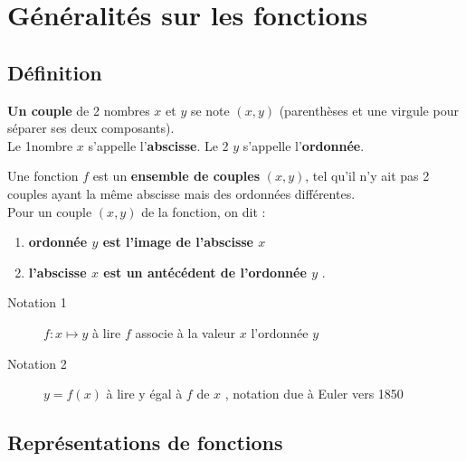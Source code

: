 \documentclass[main.tex]{subfiles}
\begin{document}
 
\cleardoublepage 
{}  
\pagestyle{scrheadings} %
\onehalfspacing 
\setcounter{chapter}{6}
\chapter{Généralités sur les fonctions}



\section{Définition}
\textbf{Un couple}  de 2 nombres $x$ et $y$ se note $(x,y)$ (parenthèses et une virgule pour séparer ses deux composants). \\
Le 1\ier nombre $x$ s'appelle l'\textbf{abscisse}. Le 2 $y$ s'appelle l'\textbf{ordonnée}.  
\begin{definition} 
	Une fonction $f$ est un \textbf{ensemble de couples} $(x,y)$, tel qu'il n'y ait pas 2 couples  ayant la même abscisse mais des ordonnées différentes.  \\
	Pour un couple $(x,y)$ de la fonction, on dit :
	\begin{enumerate}[label=\textbullet,leftmargin=*]
		\item \og \textbf{ordonnée $y$ est l'image de l'abscisse $x$} \fg{}  
		\item \og \textbf{l'abscisse $x$ est un antécédent de l'ordonnée $y$} \fg{}.  
	\end{enumerate} 
\end{definition} 

\begin{description}
	\item[Notation 1] \og $f\colon x\mapsto y$ \fg \quad à lire \og	$f$ associe à la valeur $x$ l'ordonnée $y$ \fg{}
	\item[Notation 2] \og $y = f(x)$ \fg \quad  à lire \og y égal à $f$ de $x$ \fg{}, notation due à Euler vers 1850 
\end{description}  
%
\newpage 
\section{Représentations de fonctions}
\end{document}
